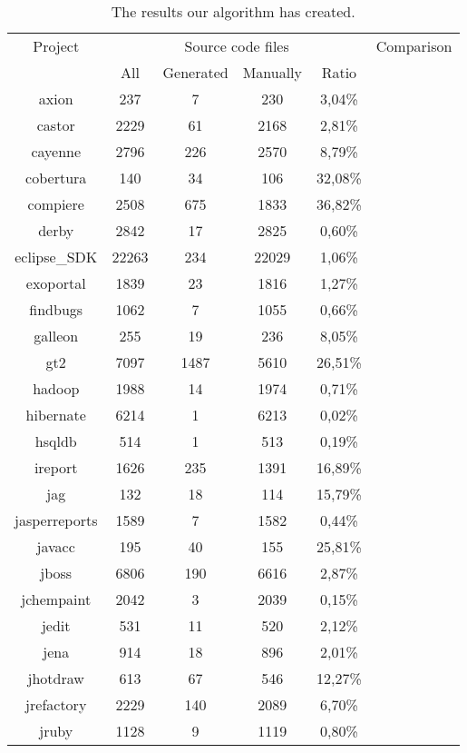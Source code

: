 \setlength{\extrarowheight}{-.1em}
\begin{table}
	\caption{The results our algorithm has created.}
	\label{table:countQualitasCorpus}
	\begin{tabularx}{\textwidth}{c|c|c|c|c|c}
		Project & \multicolumn{4}{c|}{Source code files} & Comparison \\
		& All & Generated & Manually & Ratio & \\
		\hline
		axion & 237 & 7 & 230 & 3,04\%  & \\
		castor & 2229 & 61 & 2168 & 2,81\%  & \\
		cayenne & 2796 & 226 & 2570 & 8,79\%  & \\
		cobertura & 140 & 34 & 106 & 32,08\%  & \\
		compiere & 2508 & 675 & 1833 & 36,82\%  & \\
		derby & 2842 & 17 & 2825 & 0,60\%  & \\
		eclipse\_SDK & 22263 & 234 & 22029 & 1,06\%  & \\
		exoportal & 1839 & 23 & 1816 & 1,27\%  & \\
		findbugs & 1062 & 7 & 1055 & 0,66\%  & \\
		galleon & 255 & 19 & 236 & 8,05\%  & \\
		gt2 & 7097 & 1487 & 5610 & 26,51\%  & \\
		hadoop & 1988 & 14 & 1974 & 0,71\%  & \\
		hibernate & 6214 & 1 & 6213 & 0,02\%  & \\
		hsqldb & 514 & 1 & 513 & 0,19\%  & \\
		ireport & 1626 & 235 & 1391 & 16,89\%  & \\
		jag & 132 & 18 & 114 & 15,79\%  & \\
		jasperreports & 1589 & 7 & 1582 & 0,44\%  & \\
		javacc & 195 & 40 & 155 & 25,81\%  & \\
		jboss & 6806 & 190 & 6616 & 2,87\%  & \\
		jchempaint & 2042 & 3 & 2039 & 0,15\%  & \\
		jedit & 531 & 11 & 520 & 2,12\%  & \\
		jena & 914 & 18 & 896 & 2,01\%  & \\
		jhotdraw & 613 & 67 & 546 & 12,27\%  & \\
		jrefactory & 2229 & 140 & 2089 & 6,70\%  & \\
		jruby & 1128 & 9 & 1119 & 0,80\%  & \\

\end{tabularx}
\end{table}
